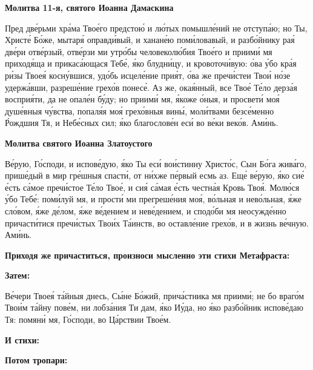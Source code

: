  

\bfseries Молитва 11-я, святого Иоанна Дамаскина\normalfont{}


   Пред две́рьми хра́ма Твое́го предстою́ и лю́тых помышле́ний не отступа́ю;
но Ты, Христе́ Бо́же, мытаря́ оправди́вый, и ханане́ю поми́ловавый, и
разбо́йнику рая́ две́ри отве́рзый, отве́рзи ми утро́бы человеколю́бия Твое́го и
приими́ мя приходя́ща и прикаса́ющася Тебе́, я́ко блудни́цу, и кровоточи́вую:
о́ва у́бо кра́я ри́зы Твоея́ косну́вшися, удо́бь исцеле́ние прия́т, о́ва же
пречи́стеи Твои́ но́зе удержа́вши, разреше́ние грехо́в понесе́. Аз же,
окая́нный, все Твое́ Те́ло дерза́я восприя́ти, да не опале́н бу́ду; но приими́ мя,
я́коже о́ныя, и просвети́ моя́ душе́вныя чу́вства, попаля́я моя́ грехо́вныя
вины́, моли́твами безсе́менно Р́ождшия Тя, и Небе́сных сил; я́ко благослове́н
еси́ во ве́ки веко́в. Ами́нь.



 

\bfseries Молитва святого Иоанна Златоустого\normalfont{}


   Ве́рую, Го́споди, и испове́дую, я́ко Ты еси́ вои́стинну Христо́с, Сын Бо́га
жива́го, прише́дый в мир гре́шныя спасти́, от ни́хже пе́рвый есмь аз. Еще́
ве́рую, я́ко сие́ е́сть са́мое пречи́стое Те́ло Твое́, и сия́ са́мая е́сть
честна́я Кровь Твоя́. Молю́ся у́бо Тебе́: поми́луй мя, и прости́ ми
прегреше́ния моя́, во́льная и нево́льная, я́же сло́вом, я́же де́лом, я́же
ве́дением и неве́дением, и сподо́би мя неосужде́нно причасти́тися
пречи́стых Твои́х Та́инств, во оставле́ние грехо́в, и в жизнь ве́чную.
Ами́нь.



 

\bfseries Приходя же причаститься, произноси мысленно эти стихи Метафраста:\normalfont{}



 

\bfseries Затем:\normalfont{}


   Ве́чери Твоея́ та́йныя днесь, Сы́не Бо́жий, прича́стника мя приими́;
не бо враго́м Твои́м та́йну пове́м, ни лобза́ния Ти дам, я́ко Иу́да,
но я́ко разбо́йник испове́даю Тя: помяни́ мя, Го́споди, во Ца́рствии
Твое́м.



 

\bfseries И стихи:\normalfont{}



 

\bfseries Потом тропари:\normalfont{}


